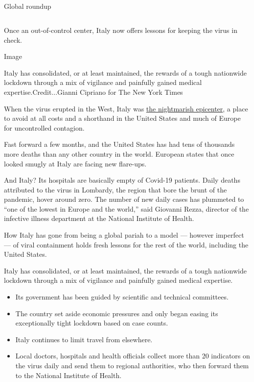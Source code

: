 Global roundup

\hypertarget{-7}{%
\subsection{}\label{-7}}

Once an out-of-control center, Italy now offers lessons for keeping the
virus in check.

Image

Italy has consolidated, or at least maintained, the rewards of a tough
nationwide lockdown through a mix of vigilance and painfully gained
medical expertise.Credit...Gianni Cipriano for The New York Times

When the virus erupted in the West, Italy was
\href{https://www.nytimes.com/interactive/2020/03/27/world/europe/coronavirus-italy-bergamo.html}{the
nightmarish epicenter}, a place to avoid at all costs and a shorthand in
the United States and much of Europe for uncontrolled contagion.

Fast forward a few months, and the United States has had tens of
thousands more deaths than any other country in the world. European
states that once looked smugly at Italy are facing new flare-ups.

And Italy? Its hospitals are basically empty of Covid-19 patients. Daily
deaths attributed to the virus in Lombardy, the region that bore the
brunt of the pandemic, hover around zero. The number of new daily cases
has plummeted to ``one of the lowest in Europe and the world,'' said
Giovanni Rezza, director of the infective illness department at the
National Institute of Health.

How Italy has gone from being a global pariah to a model --- however
imperfect --- of viral containment holds fresh lessons for the rest of
the world, including the United States.

Italy has consolidated, or at least maintained, the rewards of a tough
nationwide lockdown through a mix of vigilance and painfully gained
medical expertise.

\begin{itemize}
\item
  Its government has been guided by scientific and technical committees.
\item
  The country set aside economic pressures and only began easing its
  exceptionally tight lockdown based on case counts.
\item
  Italy continues to limit travel from elsewhere.
\item
  Local doctors, hospitals and health officials collect more than 20
  indicators on the virus daily and send them to regional authorities,
  who then forward them to the National Institute of Health.
\end{itemize}


